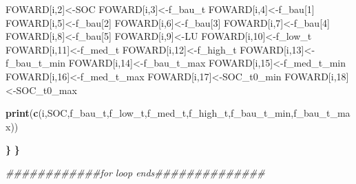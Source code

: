 \documentclass[
  10pt,
  b5paper,
]{book}
\newenvironment{Shaded}{\begin{snugshade}}{\end{snugshade}}
\newcommand{\CommentTok}[1]{\textcolor[rgb]{0.56,0.35,0.01}{\textit{#1}}}
\newcommand{\DecValTok}[1]{\textcolor[rgb]{0.00,0.00,0.81}{#1}}
\newcommand{\ErrorTok}[1]{\textcolor[rgb]{0.64,0.00,0.00}{\textbf{#1}}}
\newcommand{\KeywordTok}[1]{\textcolor[rgb]{0.13,0.29,0.53}{\textbf{#1}}}
\newcommand{\NormalTok}[1]{#1}
\begin{document}
\begin{Shaded}
\begin{Highlighting}[]
\NormalTok{FOWARD[i,}\DecValTok{2}\NormalTok{]<-SOC}
\NormalTok{FOWARD[i,}\DecValTok{3}\NormalTok{]<-f_bau_t}
\NormalTok{FOWARD[i,}\DecValTok{4}\NormalTok{]<-f_bau[}\DecValTok{1}\NormalTok{]}
\NormalTok{FOWARD[i,}\DecValTok{5}\NormalTok{]<-f_bau[}\DecValTok{2}\NormalTok{]}
\NormalTok{FOWARD[i,}\DecValTok{6}\NormalTok{]<-f_bau[}\DecValTok{3}\NormalTok{]}
\NormalTok{FOWARD[i,}\DecValTok{7}\NormalTok{]<-f_bau[}\DecValTok{4}\NormalTok{]}
\NormalTok{FOWARD[i,}\DecValTok{8}\NormalTok{]<-f_bau[}\DecValTok{5}\NormalTok{]}
\NormalTok{FOWARD[i,}\DecValTok{9}\NormalTok{]<-LU}
\NormalTok{FOWARD[i,}\DecValTok{10}\NormalTok{]<-f_low_t}
\NormalTok{FOWARD[i,}\DecValTok{11}\NormalTok{]<-f_med_t}
\NormalTok{FOWARD[i,}\DecValTok{12}\NormalTok{]<-f_high_t}
\NormalTok{FOWARD[i,}\DecValTok{13}\NormalTok{]<-f_bau_t_min}
\NormalTok{FOWARD[i,}\DecValTok{14}\NormalTok{]<-f_bau_t_max}
\NormalTok{FOWARD[i,}\DecValTok{15}\NormalTok{]<-f_med_t_min}
\NormalTok{FOWARD[i,}\DecValTok{16}\NormalTok{]<-f_med_t_max}
\NormalTok{FOWARD[i,}\DecValTok{17}\NormalTok{]<-SOC_t0_min}
\NormalTok{FOWARD[i,}\DecValTok{18}\NormalTok{]<-SOC_t0_max}



\KeywordTok{print}\NormalTok{(}\KeywordTok{c}\NormalTok{(i,SOC,f_bau_t,f_low_t,f_med_t,f_high_t,f_bau_t_min,f_bau_t_max))}

\ErrorTok{\}}
\ErrorTok{\}}

\CommentTok{############for loop ends##############}
\end{Highlighting}
\end{Shaded}
\end{document}
